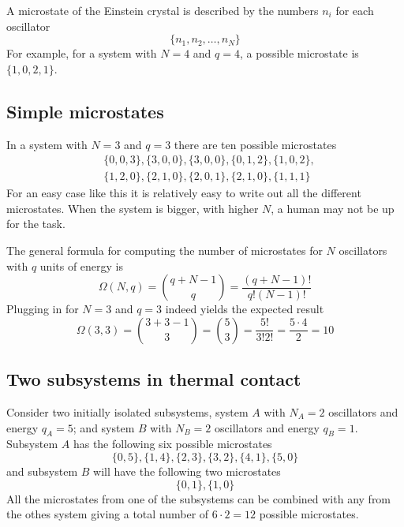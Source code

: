 \documentclass[10pt,a4paper]{amsart}
\begin{document}
A microstate of the Einstein crystal is described by the numbers $n_i$ for each oscillator
\begin{equation}
\{n_1,n_2,\dots,n_N\}
\end{equation}
For example, for a system with $N=4$ and $q=4$, a possible microstate is $\{1,0,2,1\}$.

\subsection{Simple microstates}
In a system with $N=3$ and $q=3$ there are ten possible microstates
\begin{align*}
&\{0,0,3\},\{3,0,0\},\{3,0,0\},\{0,1,2\},\{1,0,2\},\\
&\{1,2,0\},\{2,1,0\},\{2,0,1\},\{2,1,0\},\{1,1,1\}
\end{align*}
For an easy case like this it is relatively easy to write out all the different microstates. When the system is bigger, with higher $N$, a human may not be up for the task.

The general formula for computing the number of microstates for $N$ oscillators with $q$ units of energy is
\begin{equation}
\label{eq:binom}
\Omega(N,q)=\binom{q+N-1}{q}=\frac{(q+N-1)!}{q!(N-1)!}
\end{equation} 
Plugging in for $N=3$ and $q=3$ indeed yields the expected result
\begin{equation*}
\Omega(3,3)=\binom{3+3-1}{3}=\binom{5}{3}=\frac{5!}{3!2!}=\frac{5\cdot4}{2}=10
\end{equation*}

\subsection{Two subsystems in thermal contact}
Consider two initially isolated subsystems, system $A$ with $N_A=2$ oscillators and energy $q_A=5$; and system $B$ with $N_B=2$ oscillators and energy $q_B=1$. Subsystem $A$ has the following six possible microstates 
\begin{equation}
\{0,5\},\{1,4\},\{2,3\},\{3,2\},\{4,1\},\{5,0\}
\end{equation} 
and subsystem $B$ will have the following two microstates
\begin{equation}
\{0,1\},\{1,0\}
\end{equation}
All the microstates from one of the subsystems can be combined with any from the othes system giving a total number of $6\cdot2=12$ possible microstates.
\end{document}
